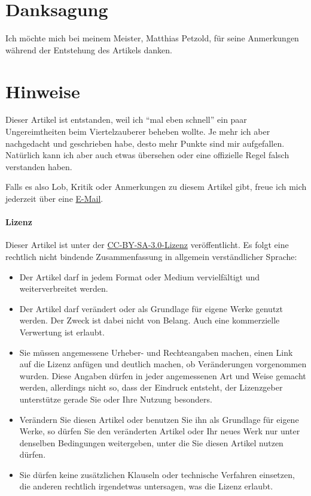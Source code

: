 \section{Danksagung}
Ich möchte mich bei meinem Meister, Matthias Petzold, für seine Anmerkungen während der Entstehung des Artikels danken.

\section{Hinweise}
Dieser Artikel ist entstanden, weil ich \enquote{mal eben schnell} ein paar Ungereimtheiten beim Viertelzauberer beheben wollte. Je mehr ich aber nachgedacht und geschrieben habe, desto mehr Punkte sind mir aufgefallen. Natürlich kann ich aber auch etwas übersehen oder eine offizielle Regel falsch verstanden haben.

Falls es also Lob, Kritik oder Anmerkungen zu diesem Artikel gibt, freue ich mich jederzeit über eine \href{http://kreuvf.de/impressum.php}{E-Mail}.

\paragraph{Lizenz}
Dieser Artikel ist unter der \href{http://creativecommons.org/licenses/by-sa/3.0/de/}{CC-BY-SA-3.0-Lizenz} veröffentlicht. Es folgt eine rechtlich nicht bindende Zusammenfassung in allgemein verständlicher Sprache:
\begin{itemize}
	\item Der Artikel darf in jedem Format oder Medium vervielfältigt und weiterverbreitet werden.
	\item Der Artikel darf verändert oder als Grundlage für eigene Werke genutzt werden. Der Zweck ist dabei nicht von Belang. Auch eine kommerzielle Verwertung ist erlaubt.
	\item Sie müssen angemessene Urheber- und Rechteangaben machen, einen Link auf die Lizenz anfügen und deutlich machen, ob Veränderungen vorgenommen wurden. Diese Angaben dürfen in jeder angemessenen Art und Weise gemacht werden, allerdings nicht so, dass der Eindruck entsteht, der Lizenzgeber unterstütze gerade Sie oder Ihre Nutzung besonders.
	\item Verändern Sie diesen Artikel oder benutzen Sie ihn als Grundlage für eigene Werke, so dürfen Sie den veränderten Artikel oder Ihr neues Werk nur unter denselben Bedingungen weitergeben, unter die Sie diesen Artikel nutzen dürfen.
	\item Sie dürfen keine zusätzlichen Klauseln oder technische Verfahren einsetzen, die anderen rechtlich irgendetwas untersagen, was die Lizenz erlaubt.
\end{itemize}

